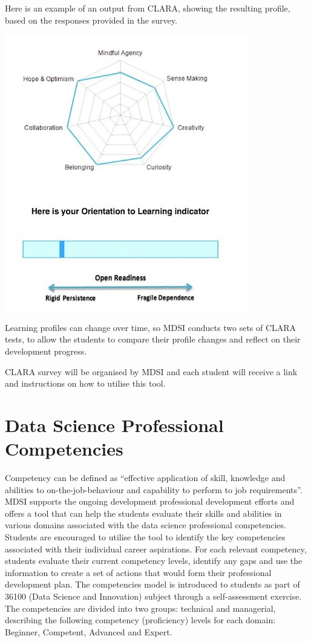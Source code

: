 \documentclass[]{book}
\theoremstyle{definition}
\theoremstyle{definition}
\theoremstyle{remark}
\begin{document}
Here is an example of an output from CLARA, showing the resulting
profile, based on the responses provided in the survey.

\includegraphics[width=0.5\linewidth]{Images/Clara}

Learning profiles can change over time, so MDSI conducts two sets of
CLARA tests, to allow the students to compare their profile changes and
reflect on their development progress.

CLARA survey will be organised by MDSI and each student will receive a
link and instructions on how to utilise this tool.

\section{Data Science Professional
Competencies}\label{data-science-professional-competencies}

Competency can be defined as ``effective application of skill, knowledge
and abilities to on-the-job-behaviour and capability to perform to job
requirements''. MDSI supports the ongoing development professional
development efforts and offers a tool that can help the students
evaluate their skills and abilities in various domains associated with
the data science professional competencies. Students are encouraged to
utilise the tool to identify the key competencies associated with their
individual career aspirations. For each relevant competency, students
evaluate their current competency levels, identify any gaps and use the
information to create a set of actions that would form their
professional development plan. The competencies model is introduced to
students as part of 36100 (Data Science and Innovation) subject through
a self-assessment exercise. The competencies are divided into two
groups: technical and managerial, describing the following competency
(proficiency) levels for each domain: Beginner, Competent, Advanced and
Expert.
\end{document}
